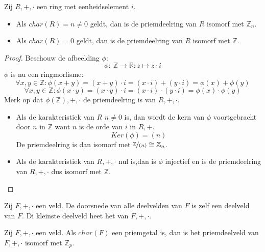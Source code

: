 \documentclass[main.tex]{subfiles}
\begin{document}
\begin{st}
  \label{st:karakteristiek-isomorfisme-met-zn}
  Zij $R,+,\cdot$ een ring met eenheidselement $i$.
  \begin{itemize}
  \item Als $char(R) = n \neq 0$ geldt, dan is de priemdeelring van $R$ isomorf met $\mathbb{Z}_{n}$.
  \item Als $char(R) = 0$ geldt, dan is de priemdeelring van $R$ isomorf met $\mathbb{Z}$.
  \end{itemize}

  \begin{proof}
    Beschouw de afbeelding $\phi$:
    \[ \phi:\ \mathbb{Z} \rightarrow \mathbb{R}: z \mapsto z\cdot i \]
    $\phi$ is nu een ringmorfisme:
    \[ \forall x,y\in \mathbb{Z}: \phi(x+y) = (x+y) \cdot i = (x \cdot i) + (y \cdot i) = \phi(x) + \phi(y) \]
    \[ \forall x,y\in \mathbb{Z}: \phi(x\cdot y) = (x\cdot y) \cdot i = (x \cdot i) \cdot (y \cdot i) = \phi(x) \cdot \phi(y) \]
    Merk op dat $\phi(\mathbb{Z}),+,\cdot$ de priemdeelring is van $R,+,\cdot$.
    \begin{itemize}
    \item Als de karakteristiek van $R$ $n\neq 0$ is, dan wordt de kern van $\phi$ voortgebracht door $n$ in $\mathbb{Z}$ want $n$ is de orde van $i$ in $R,+$.
      \[ Ker(\phi) = (n) \]
      De priemdeelring is dan isomorf met $\nicefrac{\mathbb{Z}}{(n)} \cong \mathbb{Z}_{n}$.\needed
    \item Als de karakteristiek van $R,+,\cdot$ nul is,dan is $\phi$ injectief \waarom en is de priemdeelring van $R,+,\cdot$ dus isomorf met $\mathbb{Z}$.
    \end{itemize}
  \end{proof}
\end{st}


\begin{de}
  Zij $F,+,\cdot$ een veld.
  De doorsnede van alle deelvelden van $F$ is zelf een deelveld van $F$.
  Di kleinste deelveld heet het  van $F,+,\cdot$.
\end{de}
\begin{st}
  Zij $F,+,\cdot$ een veld.
  Als $char(F)$ een priemgetal is, dan is het priemdeelveld van $F,+,\cdot$ isomorf met $\mathbb{Z}_{p}$.
\end{st}
\end{document}
